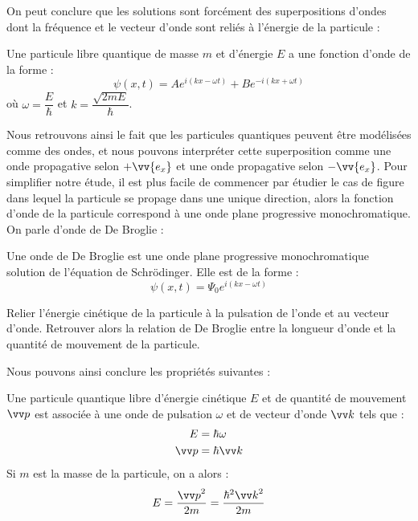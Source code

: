 \documentclass[11pt,fleqn]{book} %
\begin{document}
On peut conclure que les solutions sont forcément des superpositions d'ondes dont la fréquence et le vecteur d'onde sont reliés à l'énergie de la particule :
\begin{theorem}
	Une particule libre quantique de masse $m$ et d'énergie $E$ a une fonction d'onde de la forme :
	\begin{equation}
		\psi(x,t) = A e^{i(kx - \omega t)} + B e^{-i(k x + \omega t)}
	\end{equation}
	où $\omega = \dfrac{E}{\hbar}$ et $k = \dfrac{\sqrt{2mE}}{\hbar}$.
\end{theorem}

Nous retrouvons ainsi le fait que les particules quantiques peuvent être modélisées comme des ondes, et nous pouvons interpréter cette superposition comme une onde propagative selon $+\vv{e_x}$ et une onde propagative selon $-\vv{e_x}$. Pour simplifier notre étude, il est plus facile de commencer par étudier le cas de figure dans lequel la particule se propage dans une unique direction, alors la fonction d'onde de la particule correspond à une onde plane progressive monochromatique. On parle d'onde de De Broglie :
\begin{definition}
	Une onde de De Broglie est une onde plane progressive monochromatique solution de l'équation de Schrödinger. Elle est de la forme :
	\begin{equation}
		\psi(x,t) = \Psi_0 e^{i(kx - \omega t)}
	\end{equation}
\end{definition}

\begin{capex}
	Relier l'énergie cinétique de la particule à la pulsation de l'onde et au vecteur d'onde. Retrouver alors la relation de De Broglie entre la longueur d'onde et la quantité de mouvement de la particule.
\end{capex}

Nous pouvons ainsi conclure les propriétés suivantes :
\begin{theorem}
	Une particule quantique libre d'énergie cinétique $E$ et de quantité de mouvement $\vv p$ est associée à une onde de pulsation $\omega$ et de vecteur d'onde $\vv k$ tels que :
	\begin{align}
		E &= \hbar \omega \\
		\vv p &= \hbar \vv k
	\end{align}
	Si $m$ est la masse de la particule, on a alors :
	\begin{equation}
		E = \frac{{\vv p}^2}{2m} = \frac{\hbar^2 {\vv k}^2}{2m}
	\end{equation}
\end{theorem}
\end{document}
